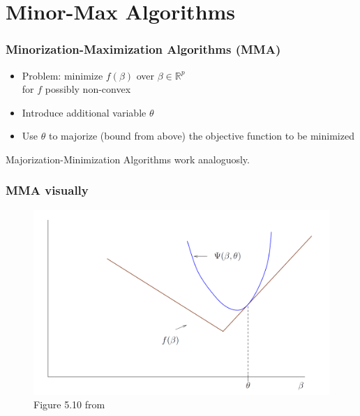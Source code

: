 \documentclass{beamer}
\newcommand{\R}{\mathbb{R}}
\begin{document}

\section{Minor-Max Algorithms}

\begin{frame}
\frametitle{Minorization-Maximization Algorithms (MMA)}
\begin{itemize}
\item Problem: minimize $f(\beta)$ over $\beta\in\R^p$\\ for $f$ possibly non-convex
\item Introduce additional variable $\theta$
\item Use $\theta$ to majorize (bound from above) the objective function to be minimized
\end{itemize}






{\small Majorization-Minimization Algorithms work analoguosly.}
\end{frame}

\begin{frame}
\frametitle{MMA visually}
\begin{figure}
\includegraphics[width=\textwidth]{img/minmaxalgo.png}
\caption{Figure 5.10 from \cite{Has15}}
\end{figure}

\end{frame}
\end{document}
